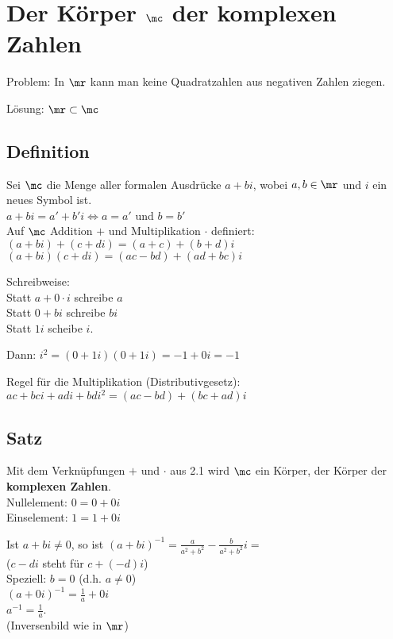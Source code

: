 \chapter{Der Körper \texorpdfstring{$\mathbb{\mc}$}{C} der komplexen Zahlen}

Problem: In $\mr$ kann man keine Quadratzahlen aus negativen Zahlen ziegen.

Lösung: $\mr\subset\mc$

\section{Definition}
	Sei $\mc$ die Menge aller formalen Ausdrücke $a+bi$, wobei $a,b\in\mr$ und $i$ ein neues Symbol ist.\\
	$a+bi=a'+b'i\Leftrightarrow a=a'$ und $b=b'$\\
	Auf $\mc$ Addition $+$ und Multiplikation $\cdot$ definiert:\\
	$(a+bi)+(c+di)=(a+c)+(b+d)i$\\
	$(a+bi)(c+di)=(ac-bd)+(ad+bc)i$

	Schreibweise:\\
	Statt $a+0\cdot i$ schreibe $a$\\
	Statt $0+bi$ schreibe $bi$\\
	Statt $1i$ scheibe $i$.

	Dann: $i^2=(0+1i)(0+1i)=-1+0i=-1$

	Regel für die Multiplikation (Distributivgesetz):\\
	$ac+bci+adi+bdi^2=(ac-bd)+(bc+ad)i$

\section{Satz}
		\item Mit dem Verknüpfungen $+$ und $\cdot$ aus 2.1 wird $\mc$ ein Körper, der Körper der \textbf{komplexen Zahlen}.\\
		Nullelement: $0=0+0i$\\
		Einselement: $1=1+0i$
		\item Ist $a+bi\neq 0$, so ist $(a+bi)^{-1}=\frac{a}{a^2+b^2}-\frac{b}{a^2+b^2}i=$\\
		($c-di$ steht für $c+(-d)i$)\\
		Speziell: $b=0$ (d.h. $a\neq 0$)\\
		$(a+0i)^{-1}=\frac{1}{a}+0i$\\
		$a^{-1}=\frac{1}{a}$.\\
		(Inversenbild wie in $\mr$)

